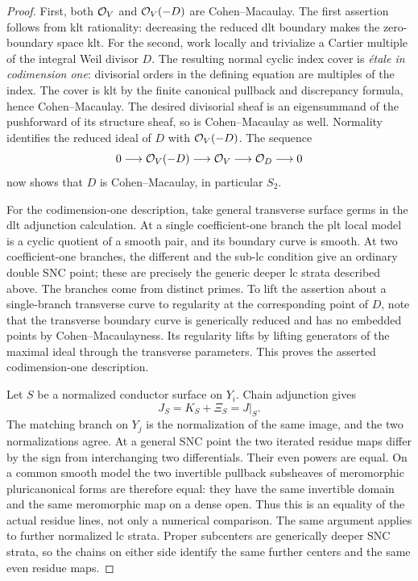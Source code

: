 \begin{proof}
First, both $\mathcal{O}_V$ and $\mathcal{O}_V(-D)$ are Cohen--Macaulay.  The first
assertion follows from klt rationality: decreasing the reduced dlt
boundary makes the zero-boundary space klt.  For the second, work
locally and trivialize a Cartier multiple of the integral Weil divisor
$D$.  The resulting normal cyclic index cover is \emph{\'etale in
codimension one}: divisorial orders in the defining equation are
multiples of the index.  The cover is klt by the finite canonical
pullback and discrepancy formula, hence Cohen--Macaulay.  The desired
divisorial sheaf is an eigensummand of the pushforward of its structure
sheaf, so is Cohen--Macaulay as well.  Normality identifies the reduced
ideal of $D$ with $\mathcal{O}_V(-D)$.  The sequence
\[
 0\longrightarrow\mathcal{O}_V(-D)\longrightarrow\mathcal{O}_V
   \longrightarrow\mathcal{O}_D\longrightarrow0
\]
now shows that $D$ is Cohen--Macaulay, in particular $S_2$.

For the codimension-one description, take general transverse surface
germs in the dlt adjunction calculation.  At a single coefficient-one
branch the plt local model is a cyclic quotient of a smooth pair, and
its boundary curve is smooth.  At two coefficient-one branches, the
different and the sub-lc condition give an ordinary double SNC point;
these are precisely the generic deeper lc strata described above.  The
branches come from distinct primes.  To lift the assertion about a
single-branch transverse curve to regularity at the corresponding
point of $D$, note that the transverse boundary curve is generically
reduced and has no embedded points by Cohen--Macaulayness.  Its
regularity lifts by lifting generators of the maximal ideal through
the transverse parameters.  This proves the asserted codimension-one
description.

Let $S$ be a normalized conductor surface on $Y_i$.  Chain adjunction
gives
\begin{equation}
 \label{floor:surface-adjunction}
 J_S=K_S+\Xi_S=J|_S.
\end{equation}
The matching branch on $Y_j$ is the normalization of the same image,
and the two normalizations agree.  At a general SNC point the two
iterated residue maps differ by the sign from interchanging two
differentials.  Their even powers are equal.  On a common smooth model
the two invertible pullback subsheaves of meromorphic pluricanonical
forms are therefore equal: they have the same invertible domain and
the same meromorphic map on a dense open.  Thus this is an equality of
the actual residue lines, not only a numerical comparison.  The same
argument applies to further normalized lc strata.  Proper subcenters
are generically deeper SNC strata, so the chains on either side
identify the same further centers and the same even residue maps.


\end{proof}
